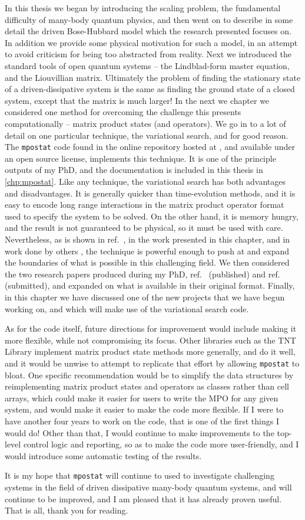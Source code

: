 In this thesis we began by introducing the scaling problem, the fundamental difficulty of many-body quantum physics, and then went on to describe in some detail the driven Bose-Hubbard model which the research presented focuses on. In addition we provide some physical motivation for such a model, in an attempt to avoid criticism for being too abstracted from reality. Next we introduced the standard tools of open quantum systems -- the Lindblad-form master equation, and the Liouvillian matrix. Ultimately the problem of finding the stationary state of a driven-dissipative system is the same as finding the ground state of a closed system, except that the matrix is much larger! In the next we chapter we considered one method for overcoming the challenge this presents computationally -- matrix product states (and operators). We go in to a lot of detail on one particular technique, the variational search, and for good reason. The \lstinline$mpostat$ code found in the online repository hosted at \cite{otb:gitVSSS}, and available under an open source license, implements this technique. It is one of the principle outputs of my PhD, and the documentation is included in this thesis in \cref{chp:mpostat}. Like any technique, the variational search has both advantages and disadvantages. It is generally quicker than time-evolution methods, and it is easy to encode long range interactions in the matrix product operator format used to specify the system to be solved. On the other hand, it is memory hungry, and the result is not guaranteed to be physical, so it must be used with care. Nevertheless, as is shown in ref.~\cite{Owen2017}, in the work presented in this chapter, and in work done by others \cite{Cui2015,Mascarenhas2015}, the technique is powerful enough to push at and expand the boundaries of what is possible in this challenging field. We then considered the two research papers produced during my PhD, ref.~\cite{Owen2017} (published) and ref.~\cite{Brown2018} (submitted), and expanded on what is available in their original format. Finally, in this chapter we have discussed one of the new projects that we have begun working on, and which will make use of the variational search code.

As for the code itself, future directions for improvement would include making it more flexible, while not compromising its focus. Other libraries such as the TNT Library \cite{TNTlib,Al-Assam2017} implement matrix product state methods more generally, and do it well, and it would be unwise to attempt to replicate that effort by allowing \lstinline$mpostat$ to bloat. One specific recommendation would be to simplify the data structures by reimplementing matrix product states and operators as classes rather than cell arrays, which could make it easier for users to write the MPO for any given system, and would make it easier to make the code more flexible. If I were to have another four years to work on the code, that is one of the first things I would do! Other than that, I would continue to make improvements to the top-level control logic and reporting, so as to make the code more user-friendly, and I would introduce some automatic testing of the results. 

It is my hope that \lstinline$mpostat$ will continue to used to investigate challenging systems in the field of driven dissipative many-body quantum systems, and will continue to be improved, and I am pleased that it has already proven useful. That is all, thank you for reading.